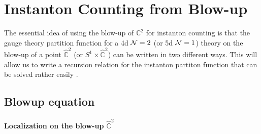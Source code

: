 \documentclass[letterpaper, 11pt]{article}
\def\IC{\mathbb{C}}
\def\CN{{\cal N}}
\begin{document}
%
%

\section{Instanton Counting from Blow-up} \label{sec:blowup}



The essential idea of using the blow-up of ${\IC}^2$ for instanton counting is that the gauge theory partition function for a 4d $\CN=2$ (or 5d $\CN=1$) theory on the blow-up of a point $\hat{\IC}^2$ (or $S^1 \times \hat{\IC}^2$) can be written in two different ways. This will allow us to write a recursion relation for the instanton partiton function that can be solved rather easily \cite{Nakajima:2003pg, Nakajima:2003uh,Nakajima:2005fg, Keller:2012da}. 




\subsection{Blowup equation}

\paragraph{Localization on the blow-up $\hat{\IC}^2$}
\end{document}
